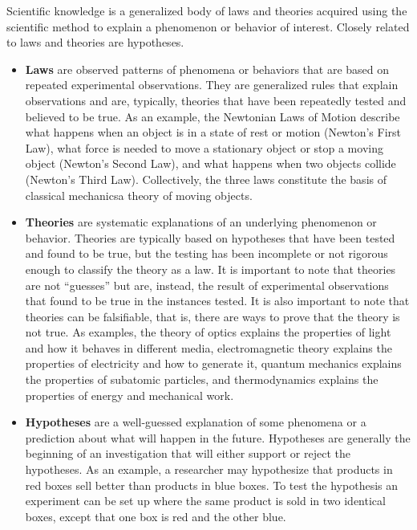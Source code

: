 Scientific knowledge is a generalized body of laws and theories acquired using the scientific method to explain a phenomenon or behavior of interest. Closely related to laws and theories are hypotheses.

\begin{itemize}
	\item \textbf{Laws} are observed patterns of phenomena or behaviors that are based on repeated experimental observations. They are generalized rules that explain observations and are, typically, theories that have been repeatedly tested and believed to be true. As an example, the Newtonian Laws of Motion describe what happens when an object is in a state of rest or motion (Newton's First Law), what force is needed to move a stationary object or stop a moving object (Newton's Second Law), and what happens when two objects collide (Newton's Third Law). Collectively, the three laws constitute the basis of classical mechanics\textemdash a theory of moving objects. 

	\item \textbf{Theories} are systematic explanations of an underlying phenomenon or behavior. Theories are typically based on hypotheses that have been tested and found to be true, but the testing has been incomplete or not rigorous enough to classify the theory as a law. It is important to note that theories are not ``guesses'' but are, instead, the result of experimental observations that found to be true in the instances tested. It is also important to note that theories can be falsifiable, that is, there are ways to prove that the theory is not true. As examples, the theory of optics explains the properties of light and how it behaves in different media, electromagnetic theory explains the properties of electricity and how to generate it, quantum mechanics explains the properties of subatomic particles, and thermodynamics explains the properties of energy and mechanical work. 

	\item \textbf{Hypotheses} are a well-guessed explanation of some phenomena or a prediction about what will happen in the future. Hypotheses are generally the beginning of an investigation that will either support or reject the hypotheses. As an example, a researcher may hypothesize that products in red boxes sell better than products in blue boxes. To test the hypothesis an experiment can be set up where the same product is sold in two identical boxes, except that one box is red and the other blue.
\end{itemize}

